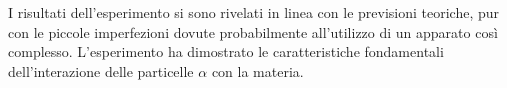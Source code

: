 I risultati dell'esperimento si sono rivelati in linea con le previsioni teoriche, pur con le piccole imperfezioni
dovute probabilmente all'utilizzo di un apparato così complesso. L'esperimento ha dimostrato le caratteristiche fondamentali 
dell'interazione delle particelle $\alpha$ con la materia.